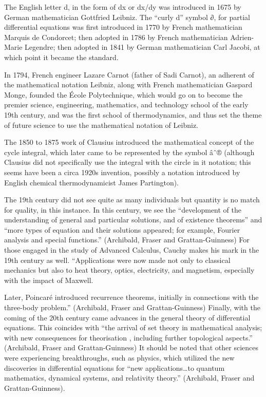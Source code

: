 \documentclass[12pt]{report}
\begin{document}
The English letter d, in the form of dx or dx/dy was introduced in 1675 by German mathematician Gottfried Leibniz. The “curly d” symbol ∂, for partial differential equations was first introduced in 1770 by French mathematician Marquis de Condorcet; then adopted in 1786 by French mathematician Adrien-Marie Legendre; then adopted in 1841 by German mathematician Carl Jacobi, at which point it became the standard.

In 1794, French engineer Lazare Carnot (father of Sadi Carnot), an adherent of the mathematical notation Leibniz, along with French mathematician Gaspard Monge, founded the École Polytechnique, which would go on to become the premier science, engineering, mathematics, and technology school of the early 19th century, and was the first school of thermodynamics, and thus set the theme of future science to use the mathematical notation of Leibniz.

The 1850 to 1875 work of Clausius introduced the mathematical concept of the cycle integral, which later came to be represented by the symbol âˆ® (although Clausius did not specifically use the integral with the circle in it notation; this seems have been a circa 1920s invention, possibly a notation introduced by English chemical thermodynamicist James Partington).

\par The 19th century did not see quite as many individuals but quantity is no match for quality, in this instance.  In this century, we see the “development of the understanding of general and particular solutions, and of existence theorems” and “more types of equation and their solutions appeared; for example, Fourier analysis and special functions.” (Archibald, Fraser and Grattan-Guinness)  For those engaged in the study of Advanced Calculus, Cauchy makes his mark in the 19th century as well.  “Applications were now made not only to classical mechanics but also to heat theory, optics, electricity, and magnetism, especially with the impact of Maxwell.  
\par Later, Poincaré introduced recurrence theorems, initially in connections with the three-body problem.” (Archibald, Fraser and Grattan-Guinness)  Finally, with the coming of the 20th century came advances in the general theory of differential equations.  This coincides with “the arrival of set theory in mathematical analysis; with new consequences for theorisation , including further topological aspects.” (Archibald, Fraser and Grattan-Guinness)  It should be noted that other sciences were experiencing breakthroughs, such as physics, which utilized the new discoveries in differential equations for “new applications…to quantum mathematics, dynamical systems, and relativity theory.” (Archibald, Fraser and Grattan-Guinness).
\end{document}
